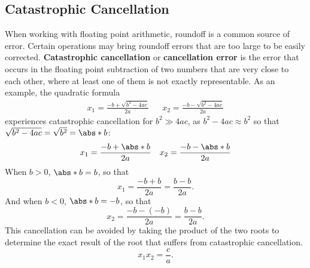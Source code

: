 \documentclass{article}
\begin{document}
\subsection{Catastrophic Cancellation}
When working with floating point arithmetic, roundoff is a common
source of error. Certain operations may bring roundoff errors that are
too large to be easily corrected. \textbf{Catastrophic cancellation} or
\textbf{cancellation error} is the error that occurs in the floating
point subtraction of two numbers that are very close to each other,
where at least one of them is not exactly representable. As an example,
the quadratic formula
\begin{align*}
    x_1 = \frac{-b + \sqrt{b^2 - 4 a c}}{2 a} &  & x_2 = \frac{-b - \sqrt{b^2 - 4 a c}}{2 a}
\end{align*}
experiences catastrophic cancellation for \(b^2 \gg 4ac\), as \(b^2 - 4ac \approx b^2\) so that
\(\sqrt{b^2 - 4ac} = \sqrt{b^2} = \abs*{b}\):
\begin{align*}
    x_1 = \frac{-b + \abs*{b}}{2 a} &  & x_2 = \frac{-b - \abs*{b}}{2 a}
\end{align*}
When \(b > 0\), \(\abs*{b} = b\), so that
\begin{equation*}
    x_1 = \frac{-b + b}{2a} = \frac{b - b}{2a}.
\end{equation*}
And when \(b < 0\), \(\abs*{b} = -b\), so that
\begin{equation*}
    x_2 = \frac{-b - \left( -b \right)}{2a} = \frac{b - b}{2a}.
\end{equation*}
This cancellation can be avoided by taking the product of the two roots
to determine the exact result of the root that suffers from catastrophic
cancellation.
\begin{equation*}
    x_1 x_2 = \frac{c}{a}.
\end{equation*}
\end{document}
